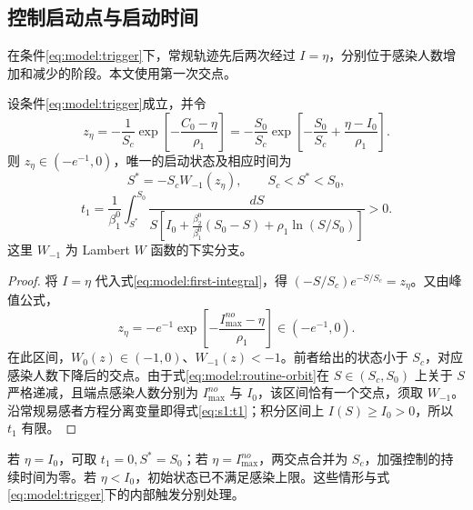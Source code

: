 \documentclass[lang=cn,a4paper,newtx]{elegantpaper}
\numberwithin{equation}{section}
\theoremstyle{plain}
\begin{document}
\subsection{控制启动点与启动时间}
在条件\eqref{eq:model:trigger}下，常规轨迹先后两次经过 $I=\eta$，分别位于感染人数增加和减少的阶段。本文使用第一次交点。
\begin{theorem}
\label{thm:s1:start}\label{thm:s1:trigger}
设条件\eqref{eq:model:trigger}成立，并令
\begin{equation}
z_\eta=-\frac{1}{S_c}\exp\!\left[-\frac{C_0-\eta}{\rho_1}\right]
=-\frac{S_0}{S_c}\exp\!\left[-\frac{S_0}{S_c}+\frac{\eta-I_0}{\rho_1}\right].
\label{eq:s1:lambert-argument}
\end{equation}
则 $z_\eta\in(-e^{-1},0)$，唯一的启动状态及相应时间为
\begin{equation}
S^*=-S_cW_{-1}(z_\eta),\qquad S_c<S^*<S_0,
\label{eq:s1:Sstar-lambert}
\end{equation}
\begin{equation}
t_1=\frac{1}{\beta_1^0}\int_{S^*}^{S_0}
\frac{dS}{S[I_0+\frac{\beta_2^0}{\beta_1^0}(S_0-S)+\rho_1\ln(S/S_0)]}>0.
\label{eq:s1:t1}
\end{equation}
这里 $W_{-1}$ 为 Lambert $W$ 函数的下实分支。
\end{theorem}
\begin{proof}
将 $I=\eta$ 代入式\eqref{eq:model:first-integral}，得
$(-S/S_c)e^{-S/S_c}=z_\eta$。又由峰值公式，
\[
z_\eta=-e^{-1}\exp\!\left[-\frac{I_{\max}^{no}-\eta}{\rho_1}\right]\in(-e^{-1},0).
\]
在此区间，$W_0(z)\in(-1,0)$、$W_{-1}(z)<-1$\cite{Corless1996}。前者给出的状态小于 $S_c$，对应感染人数下降后的交点。由于式\eqref{eq:model:routine-orbit}在 $S\in(S_c,S_0)$ 上关于 $S$ 严格递减，且端点感染人数分别为 $I_{\max}^{no}$ 与 $I_0$，该区间恰有一个交点，须取 $W_{-1}$。沿常规易感者方程分离变量即得式\eqref{eq:s1:t1}；积分区间上 $I(S)\ge I_0>0$，所以 $t_1$ 有限。
\end{proof}
若 $\eta=I_0$，可取 $t_1=0,S^*=S_0$；若 $\eta=I_{\max}^{no}$，两交点合并为 $S_c$，加强控制的持续时间为零。若 $\eta<I_0$，初始状态已不满足感染上限。这些情形与式\eqref{eq:model:trigger}下的内部触发分别处理。
\end{document}

